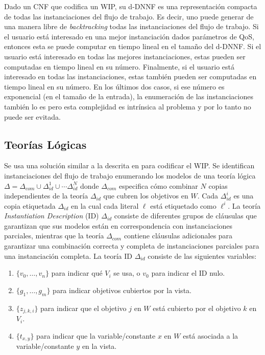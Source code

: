 Dado un CNF que codifica un WIP, su d-DNNF es una representación compacta de
todas las instanciaciones del flujo de trabajo. Es decir, uno puede generar de
una manera libre de \emph{backtracking} todas las instanciaciones del flujo de
trabajo. Si el usuario está interesado en una mejor instanciación dados
parámetros de QoS, entonces esta se puede computar en tiempo lineal en el tamaño
del d-DNNF. Si el usuario está interesado en todas las mejores instanciaciones,
estas pueden ser computadas en tiempo lineal en su número. Finalmente, si el
usuario está interesado en todas las instanciaciones, estas también pueden ser
computadas en tiempo lineal en su número. En los últimos dos casos, si ese
número es exponencial (en el tamaño de la entrada), la enumeración de las
instanciaciones también lo es pero esta complejidad es intrínsica al problema y
por lo tanto no puede ser evitada.

\subsection{Teorías Lógicas}

Se usa una solución similar a la descrita en
\cite{arvelo:aaai06} para codificar el WIP. 
Se identifican instanciaciones del flujo de trabajo enumerando los modelos de
una teoría lógica
$\Delta=\Delta_{com}\cup\Delta_{id}^1\cup\cdots\Delta_{id}^N$
donde $\Delta_{com}$ especifica cómo combinar $N$ copias independientes de la teoría
$\Delta_{id}$ que cubren los objetivos en $W$.
Cada $\Delta^i_{id}$ es una copia etiquetada $\Delta_{id}$ en la cual cada
literal 
$\ell$ está etiquetado como $\ell^i$.
La teoría \emph{Instantiation Description} (ID) $\Delta_{id}$ consiste de
diferentes grupos de cláusulas que garantizan que sus modelos están en
correspondencia con instanciaciones parciales, mientras que la teoría
$\Delta_{com}$ contiene cláusulas adicionales para garantizar una combinación
correcta y completa de instanciaciones parciales para una instanciación
completa.
La teoría ID $\Delta_{id}$ consiste de las siguientes variables:

\begin{enumerate}[--]
\item $\{v_0,\ldots,v_n\}$ para indicar qué $V_i$ se usa, o $v_0$ para indicar el ID nulo.
\item $\{g_1,\ldots,g_m\}$ para indicar objetivos cubiertos por la vista.
\item $\{z_{j,k,i}\}$ para indicar que el objetivo $j$ en $W$ está cubierto por el objetivo $k$ en $V_i$.
\item $\{t_{x,y}\}$ para indicar que la variable/constante $x$ en $W$ está asociada a la variable/constante $y$ en la vista.
\end{enumerate}

